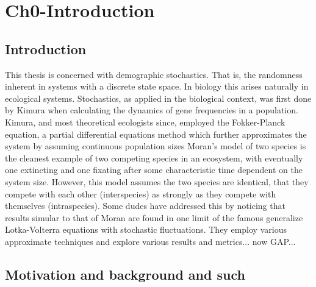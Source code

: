 \chapter{Ch0-Introduction}

\section{Introduction}

This thesis is concerned with demographic stochastics. That is, the randomness inherent in systems with a discrete state space. 
In biology this arises naturally in ecological systems. 
Stochastics, as applied in the biological context, was first done by Kimura when calculating the dynamics of gene frequencies in a population. %
Kimura, and most theoretical ecologists since, employed the Fokker-Planck equation, a partial differential equations method which further approximates the system by assuming continuous population sizes %
Moran's model of two species is the cleanest example of two competing species in an ecosystem, with eventually one extincting and one fixating after some characteristic time dependent on the system size. 
However, this model assumes the two species are identical, that they compete with each other (interspecies) as strongly as they compete with themselves (intraspecies). 
Some dudes have addressed this by noticing that results simular to that of Moran are found in one limit of the famous generalize Lotka-Volterra equations with stochastic fluctuations. 
They employ various approximate techniques and explore various results and metrics...
now GAP...



\section{Motivation and background and such}
